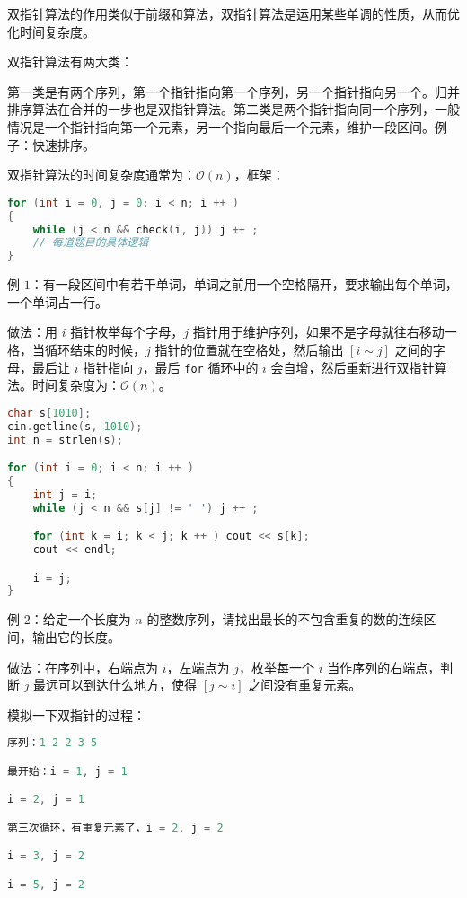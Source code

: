 
双指针算法的作用类似于前缀和算法，双指针算法是运用某些单调的性质，从而优化时间复杂度。

双指针算法有两大类：

第一类是有两个序列，第一个指针指向第一个序列，另一个指针指向另一个。归并排序算法在合并的一步也是双指针算法。第二类是两个指针指向同一个序列，一般情况是一个指针指向第一个元素，另一个指向最后一个元素，维护一段区间。例子：快速排序。

双指针算法的时间复杂度通常为：$\mathcal{O}(n)$，框架：

\begin{lstlisting}[language=cpp]
for (int i = 0, j = 0; i < n; i ++ )
{
    while (j < n && check(i, j)) j ++ ;
    // 每道题目的具体逻辑
}
\end{lstlisting}

例 $1$：有一段区间中有若干单词，单词之前用一个空格隔开，要求输出每个单词，一个单词占一行。

做法：用 $i$ 指针枚举每个字母，$j$ 指针用于维护序列，如果不是字母就往右移动一格，当循环结束的时候，$j$ 指针的位置就在空格处，然后输出 $[i \sim j]$ 之间的字母，最后让 $i$ 指针指向 $j$，最后 \verb`for` 循环中的 $i$ 会自增，然后重新进行双指针算法。时间复杂度为：$\mathcal{O}(n)$。

\begin{lstlisting}[language=cpp]
char s[1010];
cin.getline(s, 1010);
int n = strlen(s);

for (int i = 0; i < n; i ++ )
{
    int j = i;
    while (j < n && s[j] != ' ') j ++ ;

    for (int k = i; k < j; k ++ ) cout << s[k];
    cout << endl;

    i = j;
}
\end{lstlisting}



例 $2$：给定一个长度为 $n$ 的整数序列，请找出最长的不包含重复的数的连续区间，输出它的长度。

做法：在序列中，右端点为 $i$，左端点为 $j$，枚举每一个 $i$ 当作序列的右端点，判断 $j$ 最远可以到达什么地方，使得 $[j \sim i]$ 之间没有重复元素。

模拟一下双指针的过程：

\begin{lstlisting}[language=cpp]
序列：1 2 2 3 5

最开始：i = 1, j = 1

i = 2, j = 1

第三次循环，有重复元素了，i = 2, j = 2

i = 3, j = 2

i = 5, j = 2
\end{lstlisting}

